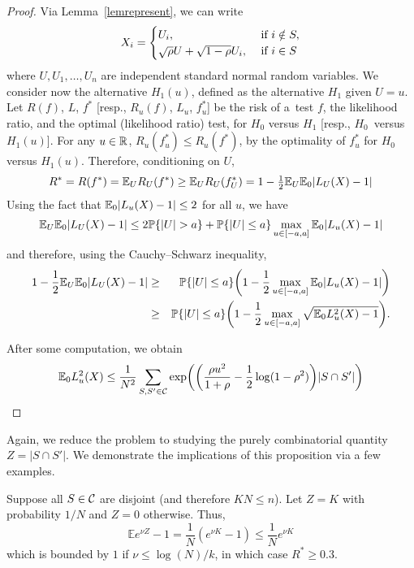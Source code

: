 \documentclass[10pt, oneside]{article}
\begin{document}
\begin{proof}
  Via Lemma~\ref{lemrepresent}, we can write 
    \[
    X_i = \begin{cases}
    U_i, \quad & \mbox{ if } i \notin S, \cr
    \sqrt{\rho}  U + \sqrt{1-\rho}  U_i, & \mbox{ if } i \in S
    \end{cases}
    \]
  where $U,U_1,\ldots,U_n$ are independent standard normal random variables.
  We consider now the alternative $H_1(u)$, defined as the alternative
$H_1$ given \mbox{$U=u$}.
Let $R(f)$, $L$, $f^*$ [resp., $R_u(f)$, $L_u$, $f_u^*$] be the risk of
a~test $f$, the likelihood ratio, and the optimal (likelihood ratio)
test, for $H_0$ versus $H_1$ [resp., $H_0$~versus $H_1(u)$]. For any $u
\in{\mathbb R}$, $R_u(f_u^*) \leq R_u(f^*)$, by the optimality of $f_u^*$
for $H_0$ versus $H_1(u)$. Therefore, conditioning on $U$,
$$R^* = R(f^*) = \mathbb{E}_{U} R_U(f^*) \geq \mathbb{E}_{U} R_U(f_U^*) = 1 - \tfrac{1}{2} \mathbb{E}_{U} \mathbb{E}_0 |L_U(X) - 1|$$
Using the fact that
$\mathbb{E}_0 |L_u(X) - 1| \le2$ for all $u$, we have
%
\[
\bE_{U} \bE_0 |L_U(X) - 1|
\le2\bP\{|U|>a\} + \bP\{|U|\le a\} \max_{u \in[-a,a]} \bE_0
|L_u(X) - 1|
\]
%
and therefore, using the Cauchy--Schwarz inequality,
%
\begin{eqnarray*}
1 - \frac{1}{2} \mathbb{E}_{U} \mathbb{E}_0 |L_U(X) - 1|
& \ge&
\mathbb{P}\{|U|\le a\}\biggl( 1-\frac{1}{2}\max_{u \in[-a,a]} \mathbb{E}_0
|L_u(X) - 1|\biggr)
\\
& \geq& \mathbb{P}\{|U|\le a\}\biggl(1 - \frac12 \max_{u \in[-a,a]}
\sqrt{\mathbb{E}_0 L_u^2(X) - 1}\biggr).
\end{eqnarray*}

After some computation, we obtain 
$$\mathbb{E}_0 L_u^2(X) \le \frac{1}{N^2} \sum_{S, S' \in{\mathcal C}}
\exp\biggl(\biggl(\frac{\rho u^2}{1+\rho}- \frac12\log(1-\rho
^2)\biggr) |S \cap S'| \biggr)$$
\end{proof}

Again, we reduce the problem to studying the purely combinatorial quantity $Z = |S \cap S'|$. We demonstrate the implications of this proposition via a few examples.
\begin{exmp}
  Suppose all $S\in{\mathcal C}$ are disjoint (and therefore $KN\le n$). Let $Z = K$ with probability $1/N$ and $Z = 0$ otherwise. Thus,
  \[
  \mathbb{E} e^{\nu Z} -1 = \frac{1}{N} (e^{\nu K} -1)
  \le\frac{1}{N} e^{\nu K}
  \]
  which is bounded by $1$ if $\nu\le\log(N)/k$, in which case $R^* \ge0.3$.
\end{exmp}
\end{document}
